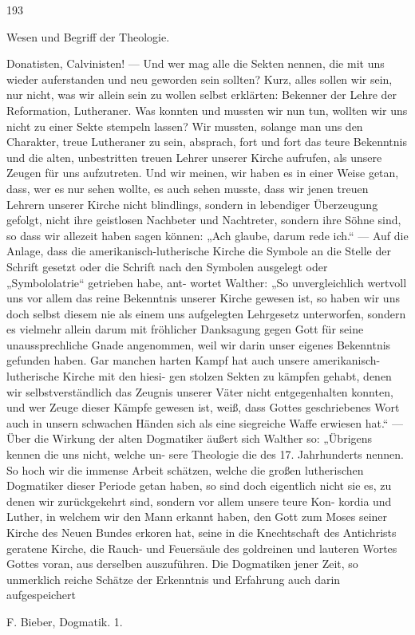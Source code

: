 \begin{flushright}193\end{flushright}
\begin{center}Wesen und Begriff der Theologie.\end{center}

Donatisten, Calvinisten! --- Und wer mag alle die Sekten nennen,
die mit uns wieder auferstanden und neu geworden sein sollten?
Kurz, alles sollen wir sein, nur nicht, was wir allein sein zu wollen
selbst erklärten: Bekenner der Lehre der Reformation, Lutheraner.
Was konnten und mussten wir nun tun, wollten wir uns nicht zu
einer Sekte stempeln lassen? Wir mussten, solange man uns den
Charakter, treue Lutheraner zu sein, absprach, fort und fort das
teure Bekenntnis und die alten, unbestritten treuen Lehrer unserer
Kirche aufrufen, als unsere Zeugen für uns aufzutreten. Und wir
meinen, wir haben es in einer Weise getan, dass, wer es nur sehen
wollte, es auch sehen musste, dass wir jenen treuen Lehrern unserer
Kirche nicht blindlings, sondern in lebendiger Überzeugung gefolgt,
nicht ihre geistlosen Nachbeter und Nachtreter, sondern ihre Söhne
sind, so dass wir allezeit haben sagen können: „Ach glaube, darum
rede ich.“ --- Auf die Anlage, dass die amerikanisch-lutherische Kirche
die Symbole an die Stelle der Schrift gesetzt oder die Schrift nach
den Symbolen ausgelegt oder „Symbololatrie“ getrieben habe, ant-
wortet Walther: „So unvergleichlich wertvoll uns vor allem das
reine Bekenntnis unserer Kirche gewesen ist, so haben wir uns doch
selbst diesem nie als einem uns aufgelegten Lehrgesetz unterworfen,
sondern es vielmehr allein darum mit fröhlicher Danksagung gegen
Gott für seine unaussprechliche Gnade angenommen, weil wir darin
unser eigenes Bekenntnis gefunden haben. Gar manchen harten
Kampf hat auch unsere amerikanisch-lutherische Kirche mit den hiesi-
gen stolzen Sekten zu kämpfen gehabt, denen wir selbstverständlich
das Zeugnis unserer Väter nicht entgegenhalten konnten, und wer
Zeuge dieser Kämpfe gewesen ist, weiß, dass Gottes geschriebenes
Wort auch in unsern schwachen Händen sich als eine siegreiche Waffe
erwiesen hat.“ --- Über die Wirkung der alten Dogmatiker äußert
sich Walther so: „Übrigens kennen die uns nicht, welche un-
sere Theologie die des 17. Jahrhunderts nennen. So hoch wir die
immense Arbeit schätzen, welche die großen lutherischen Dogmatiker
dieser Periode getan haben, so sind doch eigentlich nicht sie es, zu
denen wir zurückgekehrt sind, sondern vor allem unsere teure Kon-
kordia und Luther, in welchem wir den Mann erkannt haben, den
Gott zum Moses seiner Kirche des Neuen Bundes erkoren hat, seine
in die Knechtschaft des Antichrists geratene Kirche, die Rauch- und
Feuersäule des goldreinen und lauteren Wortes Gottes voran, aus
derselben auszuführen. Die Dogmatiken jener Zeit, so unmerklich
reiche Schätze der Erkenntnis und Erfahrung auch darin aufgespeichert

\vspace{1em}
\noindent\small F. Bieber, Dogmatik. 1.